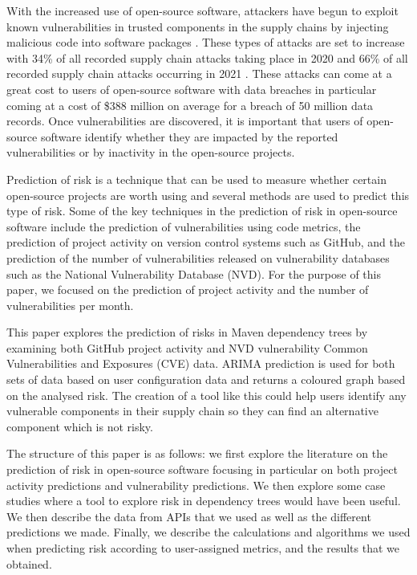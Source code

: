 \documentclass[10pt, compsoc, conference]{IEEEtran}
\begin{document}
With the increased use of open-source software, attackers have begun to exploit known vulnerabilities in trusted components in the supply chains by injecting malicious code into software packages \cite{ohm_backstabbers_2020}. These types of attacks are set to increase with 34\% of all recorded supply chain attacks taking place in 2020 and 66\% of all recorded supply chain attacks occurring in 2021 \cite{m_z_malik_protection_2023}. These attacks can come at a great cost to users of open-source software with data breaches in particular coming at a cost of \$388 million on average for a breach of 50 million data records\cite{x_wang_feasibility_2021}. Once vulnerabilities are discovered, it is important that users of open-source software identify whether they are impacted by the reported vulnerabilities or by inactivity in the open-source projects. 

Prediction of risk is a technique that can be used to measure whether certain open-source projects are worth using and several methods are used to predict this type of risk. Some of the key techniques in the prediction of risk in open-source software include the prediction of vulnerabilities using code metrics, the prediction of project activity on version control systems such as GitHub, and the prediction of the number of vulnerabilities released on vulnerability databases such as the National Vulnerability Database (NVD). For the purpose of this paper, we focused on the prediction of project activity and the number of vulnerabilities per month. 

This paper explores the prediction of risks in Maven dependency trees by examining both GitHub project activity and NVD vulnerability Common Vulnerabilities and Exposures (CVE) data. ARIMA prediction is used for both sets of data based on user configuration data and returns a coloured graph based on the analysed risk. The creation of a tool like this could help users identify any vulnerable components in their supply chain so they can find an alternative component which is not risky. 

The structure of this paper is as follows: we first explore the literature on the prediction of risk in open-source software focusing in particular on both project activity predictions and vulnerability predictions. We then explore some case studies where a tool to explore risk in dependency trees would have been useful. We then describe the data from APIs that we used as well as the different predictions we made. Finally, we describe the calculations and algorithms we used when predicting risk according to user-assigned metrics, and the results that we obtained. 
\end{document}
